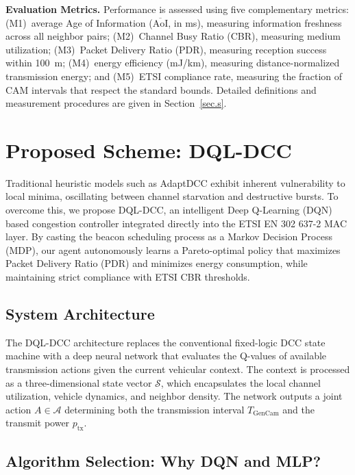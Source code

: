 \documentclass[journal]{IEEEtran}
\begin{document}
\textbf{Evaluation Metrics.}  Performance is assessed using five
complementary metrics: (M1)~average Age of Information
($\overline{\text{AoI}}$, in ms), measuring information freshness
across all neighbor pairs; (M2)~Channel Busy Ratio (CBR), measuring
medium utilization; (M3)~Packet Delivery Ratio (PDR), measuring
reception success within 100~m; (M4)~energy efficiency (mJ/km),
measuring distance-normalized transmission energy; and
(M5)~ETSI compliance rate, measuring the fraction of CAM intervals
that respect the standard bounds.  Detailed definitions and
measurement procedures are given in Section~\ref{sec.s}.


\section{Proposed Scheme: DQL-DCC}
\label{sec.prop}

Traditional heuristic models such as AdaptDCC exhibit inherent vulnerability
to local minima, oscillating between channel starvation and destructive bursts.
To overcome this, we propose DQL-DCC, an intelligent Deep Q-Learning (DQN)
based congestion controller integrated directly into the ETSI EN 302 637-2 MAC layer.
By casting the beacon scheduling process as a Markov Decision Process (MDP),
our agent autonomously learns a Pareto-optimal policy that maximizes Packet
Delivery Ratio (PDR) and minimizes energy consumption, while maintaining strict
compliance with ETSI CBR thresholds.

\subsection{System Architecture}
The DQL-DCC architecture replaces the conventional fixed-logic DCC state machine
with a deep neural network that evaluates the Q-values of available transmission
actions given the current vehicular context. The context is processed as a
three-dimensional state vector $\mathcal{S}$, which encapsulates the local
channel utilization, vehicle dynamics, and neighbor density. The network outputs
a joint action $A \in \mathcal{A}$ determining both the transmission interval
$T_{\text{GenCam}}$ and the transmit power $p_{\text{tx}}$.

\subsection{Algorithm Selection: Why DQN and MLP?}
\label{sec:justification}
\end{document}
